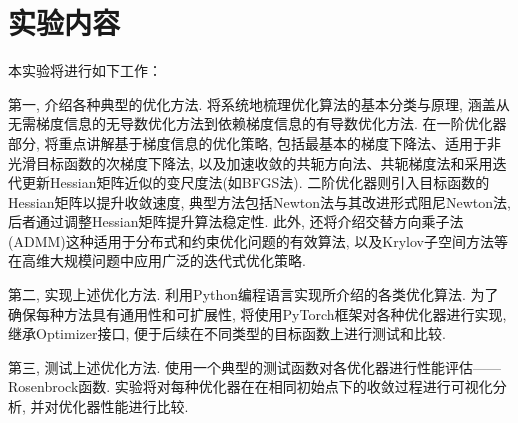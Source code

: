 \section{实验内容}

本实验将进行如下工作：

第一, 介绍各种典型的优化方法.
将系统地梳理优化算法的基本分类与原理, 涵盖从无需梯度信息的无导数优化方法到依赖梯度信息的有导数优化方法.
在一阶优化器部分, 将重点讲解基于梯度信息的优化策略, 包括最基本的梯度下降法、适用于非光滑目标函数的次梯度下降法, 以及加速收敛的共轭方向法、共轭梯度法和采用迭代更新Hessian矩阵近似的变尺度法(如BFGS法).
二阶优化器则引入目标函数的Hessian矩阵以提升收敛速度, 典型方法包括Newton法与其改进形式阻尼Newton法, 后者通过调整Hessian矩阵提升算法稳定性.
此外, 还将介绍交替方向乘子法(ADMM)这种适用于分布式和约束优化问题的有效算法, 以及Krylov子空间方法等在高维大规模问题中应用广泛的迭代式优化策略.

第二, 实现上述优化方法.
利用Python编程语言实现所介绍的各类优化算法.
为了确保每种方法具有通用性和可扩展性, 将使用PyTorch框架对各种优化器进行实现, 继承Optimizer接口, 便于后续在不同类型的目标函数上进行测试和比较.

第三, 测试上述优化方法.
使用一个典型的测试函数对各优化器进行性能评估——Rosenbrock函数.
实验将对每种优化器在在相同初始点下的收敛过程进行可视化分析, 并对优化器性能进行比较.
